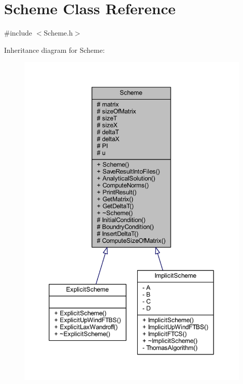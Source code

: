 \hypertarget{class_scheme}{}\section{Scheme Class Reference}
\label{class_scheme}


{\ttfamily \#include $<$Scheme.\+h$>$}



Inheritance diagram for Scheme\+:\nopagebreak
\begin{figure}[H]
\begin{center}
\leavevmode
\includegraphics[width=344pt]{class_scheme__inherit__graph}
\end{center}
\end{figure}


